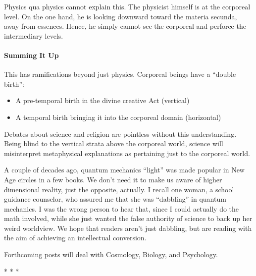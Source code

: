 Physics qua physics cannot explain this. The physicist himself is at the corporeal level. On the one hand, he is looking downward toward the materia secunda, away from essences. Hence, he simply cannot see the corporeal and perforce the intermediary levels.

\paragraph{Summing It Up}


This has ramifications beyond just physics. Corporeal beings have a ``double birth'':

\begin{itemize}


\item A pre-temporal birth in the divine creative Act (vertical)

\item A temporal birth bringing it into the corporeal domain (horizontal)
\end{itemize}


Debates about science and religion are pointless without this understanding. Being blind to the vertical strata above the corporeal world, science will misinterpret metaphysical explanations as pertaining just to the corporeal world.

A couple of decades ago, quantum mechanics ``light'' was made popular in New Age circles in a few books. We don't need it to make us aware of higher dimensional reality, just the opposite, actually. I recall one woman, a school guidance counselor, who assured me that she was ``dabbling'' in quantum mechanics. I was the wrong person to hear that, since I could actually do the math involved, while she just wanted the false authority of science to back up her weird worldview. We hope that readers aren't just dabbling, but are reading with the aim of achieving an intellectual conversion.

Forthcoming posts will deal with Cosmology, Biology, and Psychology.



\begin{center}* * *\end{center}

